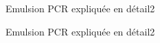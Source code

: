 \documentclass[a4paper]{article}
\begin{document}
\begin{figure}[!h]
\caption{Emulsion PCR expliquée en détail2}
\end{figure}

\begin{figure}[!h]
\caption{Emulsion PCR expliquée en détail2}
\end{figure}
\end{document}
